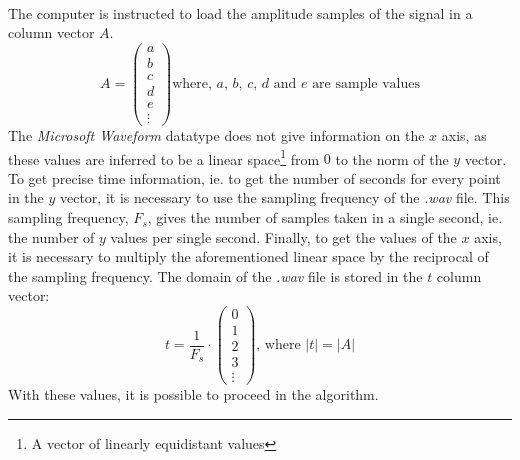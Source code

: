 \documentclass{article}
\begin{document}
\paragraph*{}
The computer is instructed to load the amplitude samples of the signal in a 
column vector $A$.
$$A =
\begin{pmatrix}
	a \\
	b \\
	c \\
	d \\
	e \\
	\vdots
\end{pmatrix}\text{where, $a$, $b$, $c$, $d$ and $e$ are sample values}
$$
The \textit{Microsoft Waveform} datatype does not give information on the $x$ 
axis, as these values are inferred to be a linear space\footnote{A vector of 
linearly equidistant values} from $0$ to the norm of the $y$ vector. To get 
precise time information, ie. to get the number of seconds for every point in 
the $y$ vector, it is necessary to use the sampling frequency of the 
\textit{.wav} file. This sampling frequency, $F_s$, gives the number of samples
taken in a single second, ie. the number of $y$ values per single second. 
Finally, to get the values of the $x$ axis, it is necessary to multiply the 
aforementioned linear space by the reciprocal of the sampling frequency. The 
domain of the \textit{.wav} file is stored in the $t$ column vector:
$$t = \frac{1}{F_s} \cdot
\begin{pmatrix}
	0 \\
	1 \\
	2 \\
	3 \\
	\vdots
\end{pmatrix}\text{, where $|t| = |A|$}
$$
With these values, it is possible to proceed in the algorithm.
\end{document}
